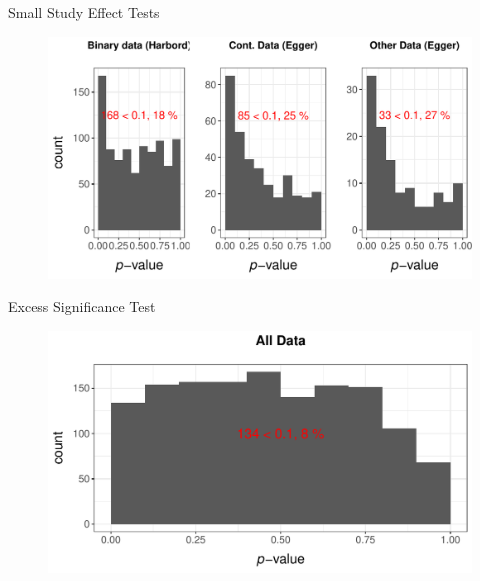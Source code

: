 \documentclass[english]{beamer}\usepackage[]{graphicx}\usepackage[]{color}
\makeatletter
\def\maxwidth{ %
  \ifdim\Gin@nat@width>\linewidth
    \linewidth
  \else
    \Gin@nat@width
  \fi
}
\newenvironment{knitrout}{}{} %
\makeatother
\begin{document}
\begin{frame}[fragile]{Small Study Effect Tests}
\begin{figure}
\begin{knitrout}
\color{fgcolor}
\includegraphics[width=\maxwidth]{figure/unnamed-chunk-4-1} 

\end{knitrout}
\end{figure}
\end{frame}


\begin{frame}[fragile]{Excess Significance Test}
\begin{figure}
\begin{knitrout}
\color{fgcolor}
\includegraphics[width=\maxwidth]{figure/unnamed-chunk-5-1} 

\end{knitrout}
\end{figure}
\end{frame}
\end{document}

